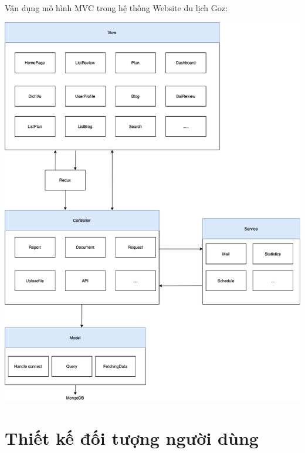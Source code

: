 Vận dụng mô hình MVC trong hệ thống Website du lịch Goz:
\begin{center}
  \captionsetup{type=figure}
  \includegraphics[width=15cm]{image/MVC11.png}
\end{center}

\section{Thiết kế đối tượng người dùng}
